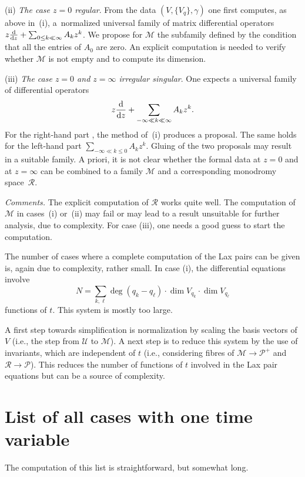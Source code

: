 \documentclass[pdftex]{sigma}
\numberwithin{equation}{section}
\begin{document}
\label{(ii)} (ii) {\it The case $z=0$ regular}. From the data $(V,\{V_q\},\gamma)$ one first computes, as above in~(i), a~normalized universal family
of matrix differential operators $z\frac{{\rm d}}{{\rm d}z}+\sum _{0\leq k \ll \infty}A_kz^k$. We propose for $\mathcal{M}$ the subfamily
defined by the condition that all the entries of $A_0$ are zero. An explicit computation is needed to verify
whether $\mathcal{M}$ is not empty and to compute its dimension.

 (iii) {\it The case $z=0$ and $z=\infty$ irregular singular}. One expects a universal family of differential operators
\[
z\frac{{\rm d}}{{\rm d}z}+\sum _{-\infty \ll k \ll \infty}A_kz^k.
\] For the right-hand part , the method of~(i) produces
a proposal. The same holds for the left-hand part $\sum _{-\infty \ll k \leq 0}A_kz^k$. Gluing of the two proposals may result in a suitable family.
A priori, it is not clear whether the formal data at $z=0$ and at $z=\infty$ can be combined to a family $\mathcal{M}$ and a
corresponding monodromy space~$\mathcal{R}$.

 {\it Comments.}
The explicit computation of $\mathcal{R}$ works quite well. The computation of $\mathcal{M}$ in cases~(i) or~(ii) may fail or
may lead to a result unsuitable for further analysis,
due to complexity. For case (iii), one needs a good guess to start the computation.

 The number of cases where
a complete computation of the Lax pairs can be given is, again due to complexity, rather small. In case (i), the differential
equations involve \[N=\sum _{k,\ell} \deg(q_k-q_\ell)\cdot \dim V_{q_k}\cdot \dim V_{q_\ell}\] functions of $t$. This system is mostly too
large.

A first step towards simplification is normalization by scaling the basis vectors of $V$ (i.e., the step from $\mathcal{U}$ to $\mathcal{M}$).
A next step is to reduce this system by the use of invariants, which are independent of $t$ (i.e., considering fibres of
$\mathcal{M}\rightarrow \mathcal{P}^+$ and $\mathcal{R}\rightarrow \mathcal{P}$). This reduces the number of functions of $t$ involved
in the Lax pair equations but can be a source of complexity.

\section{List of all cases with one time variable}\label{list}

 The computation of this list is straightforward, but somewhat long.
\end{document}
